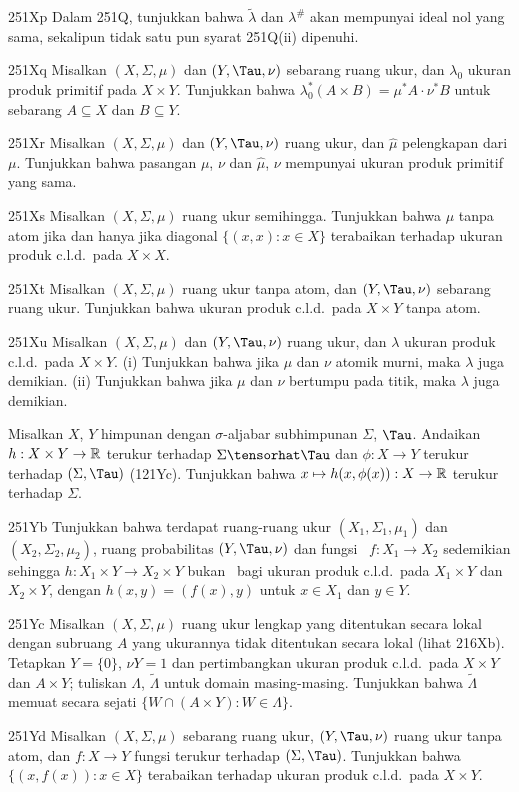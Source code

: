 {\spheader 251Xp Dalam 251Q, tunjukkan bahwa $\tilde\lambda$ dan $\lambda^{\#}$
akan mempunyai ideal nol yang sama, sekalipun tidak satu pun syarat
251Q(ii) dipenuhi.

\spheader 251Xq Misalkan $(X,\Sigma,\mu)$ dan $(Y,\Tau,\nu)$ sebarang ruang
ukur, dan $\lambda_0$ ukuran produk primitif pada $X\times Y$.
Tunjukkan bahwa $\lambda_0^*(A\times B)=\mu^*A\cdot\nu^*B$ untuk sebarang
$A\subseteq X$ dan $B\subseteq Y$.

\spheader 251Xr Misalkan $(X,\Sigma,\mu)$ dan $(Y,\Tau,\nu)$
ruang ukur, dan $\hat\mu$ pelengkapan dari $\mu$.
Tunjukkan bahwa pasangan $\mu$, $\nu$ dan $\hat\mu$, $\nu$ mempunyai ukuran produk
primitif yang sama.

\spheader 251Xs Misalkan $(X,\Sigma,\mu)$ ruang ukur semihingga.
Tunjukkan bahwa $\mu$ tanpa atom jika dan hanya jika diagonal $\{(x,x):x\in X\}$
terabaikan terhadap ukuran produk c.l.d.\ pada $X\times X$.

\spheader 251Xt Misalkan $(X,\Sigma,\mu)$ ruang ukur tanpa atom,
dan $(Y,\Tau,\nu)$ sebarang ruang ukur. Tunjukkan bahwa ukuran produk c.l.d.\
pada $X\times Y$ tanpa atom.

\sqheader 251Xu Misalkan $(X,\Sigma,\mu)$ dan $(Y,\Tau,\nu)$ ruang
ukur, dan $\lambda$ ukuran produk c.l.d.\ pada $X\times Y$.
(i) Tunjukkan bahwa jika $\mu$ dan $\nu$ atomik murni, maka $\lambda$ juga demikian.
(ii) Tunjukkan bahwa jika $\mu$ dan $\nu$ bertumpu pada titik, maka $\lambda$ juga demikian.

Misalkan $X$, $Y$ himpunan dengan $\sigma$-aljabar subhimpunan $\Sigma$, $\Tau$.
Andaikan $h:X\times Y\to\Bbb R$ terukur terhadap $\Sigma\tensorhat\Tau$
dan $\phi:X\to Y$ terukur terhadap $(\Sigma,\Tau)$ (121Yc). Tunjukkan bahwa
$x\mapsto h(x,\phi(x)):X\to\Bbb R$ terukur terhadap $\Sigma$.

\spheader 251Yb Tunjukkan bahwa terdapat
ruang-ruang ukur $(X_1,\Sigma_1,\mu_1)$ dan $(X_2,\Sigma_2,\mu_2)$,
ruang probabilitas $(Y,\Tau,\nu)$ dan fungsi \imp\ $f:X_1\to X_2$
sedemikian sehingga $h:X_1\times Y\to X_2\times Y$ bukan \imp\ bagi ukuran produk
c.l.d.\ pada $X_1\times Y$ dan $X_2\times Y$, dengan
$h(x,y)=(f(x),y)$ untuk $x\in X_1$ dan $y\in Y$.

\spheader 251Yc Misalkan $(X,\Sigma,\mu)$ ruang ukur lengkap yang
ditentukan secara lokal dengan subruang $A$ yang ukurannya tidak ditentukan secara lokal
(lihat 216Xb). Tetapkan $Y=\{0\}$, $\nu Y=1$ dan
pertimbangkan ukuran produk c.l.d.\ pada $X\times Y$ dan $A\times Y$;
tuliskan $\Lambda$, $\tilde\Lambda$ untuk domain masing-masing. Tunjukkan bahwa
$\tilde\Lambda$ memuat secara sejati $\{W\cap(A\times Y):W\in\Lambda\}$.

\spheader 251Yd Misalkan $(X,\Sigma,\mu)$ sebarang ruang ukur,
$(Y,\Tau,\nu)$ ruang ukur tanpa atom, dan $f:X\to Y$ fungsi
terukur terhadap $(\Sigma,\Tau)$. Tunjukkan bahwa $\{(x,f(x)):x\in X\}$
terabaikan terhadap ukuran produk c.l.d.\ pada $X\times Y$.
}%

